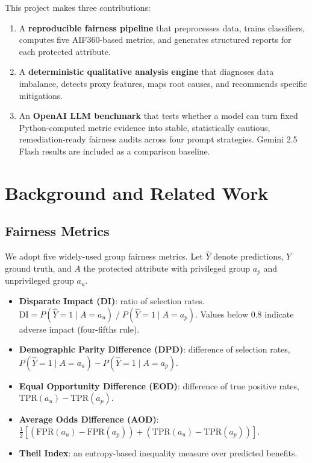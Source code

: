 \documentclass[11pt,a4paper]{article}
\begin{document}
This project makes three contributions:
\begin{enumerate}[nosep]
  \item A \textbf{reproducible fairness pipeline} that preprocesses data,
        trains classifiers, computes five AIF360-based metrics, and generates
        structured reports for each protected attribute.
  \item A \textbf{deterministic qualitative analysis engine} that diagnoses
        data imbalance, detects proxy features, maps root causes, and
        recommends specific mitigations.
  \item An \textbf{OpenAI LLM benchmark} that tests whether a model can turn
        fixed Python-computed metric evidence into stable, statistically
        cautious, remediation-ready fairness audits across four prompt
        strategies. Gemini 2.5 Flash results are included as a comparison
        baseline.
\end{enumerate}

\section{Background and Related Work}

\subsection{Fairness Metrics}

We adopt five widely-used group fairness metrics. Let $\hat{Y}$ denote
predictions, $Y$ ground truth, and $A$ the protected attribute with
privileged group $a_p$ and unprivileged group $a_u$.

\begin{itemize}[nosep]
  \item \textbf{Disparate Impact (DI)}: ratio of selection rates.
        $\text{DI} = P(\hat{Y}{=}1 \mid A{=}a_u)\;/\;P(\hat{Y}{=}1 \mid A{=}a_p)$.
        Values below 0.8 indicate adverse impact (four-fifths rule).
  \item \textbf{Demographic Parity Difference (DPD)}: difference of selection
        rates, $P(\hat{Y}{=}1 \mid A{=}a_u) - P(\hat{Y}{=}1 \mid A{=}a_p)$.
  \item \textbf{Equal Opportunity Difference (EOD)}: difference of true
        positive rates,
        $\text{TPR}(a_u) - \text{TPR}(a_p)$.
  \item \textbf{Average Odds Difference (AOD)}:
        $\frac{1}{2}[(\text{FPR}(a_u){-}\text{FPR}(a_p)) +
        (\text{TPR}(a_u){-}\text{TPR}(a_p))]$.
  \item \textbf{Theil Index}: an entropy-based inequality measure over
        predicted benefits.
\end{itemize}
\end{document}
